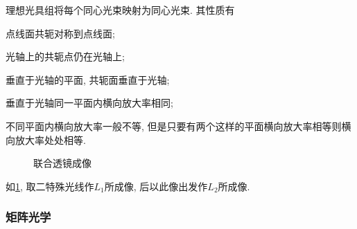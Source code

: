 \documentclass{ctexart}
\begin{document}
理想光具组将每个同心光束映射为同心光束. 其性质有
\begin{cenum}
    \item 点线面共轭对称到点线面;
    \item 光轴上的共轭点仍在光轴上;
    \item 垂直于光轴的平面, 共轭面垂直于光轴;
    \item 垂直于光轴同一平面内横向放大率相同;
    \item 不同平面内横向放大率一般不等, 但是只要有两个这样的平面横向放大率相等则横向放大率处处相等.
\end{cenum}
\begin{figure}[ht]
    \centering
    \begin{subfigure}{.95\textwidth}
        \centering
        \caption{}
    \end{subfigure}
    \begin{subfigure}{.95\textwidth}
        \centering
        \caption{}
    \end{subfigure}
    \caption{联合透镜成像}
    \label{fig:联合透镜成像}
\end{figure}
\begin{sample}
    \begin{ex}
        如\cref{fig:联合透镜成像}, 取二特殊光线作$L_1$所成像, 后以此像出发作$L_2$所成像.
    \end{ex}
\end{sample}


\subsubsection{矩阵光学} %
\label{ssub:矩阵光学}
\end{document}
